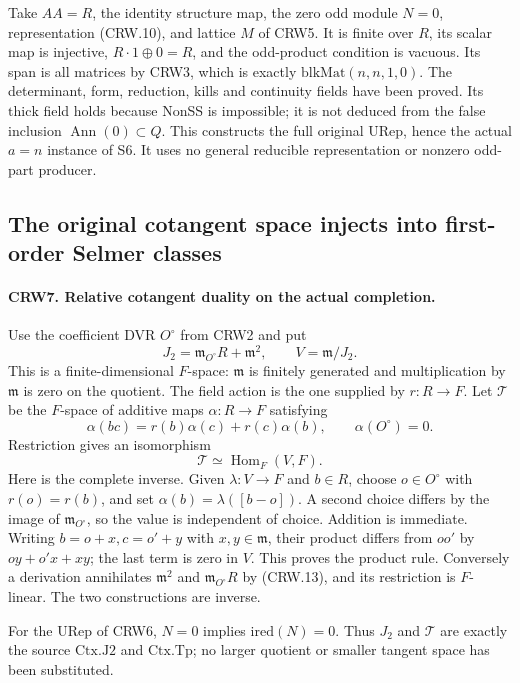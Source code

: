 Take $AA=R$, the identity structure map, the zero odd module
$N=0$, representation (CRW.10), and lattice $M$ of CRW5.
It is finite over $R$, its scalar map is injective,
$R\cdot1\oplus0=R$, and the odd-product condition is vacuous.
Its span is all matrices by CRW3, which is exactly
$\mathrm{blkMat}(n,n,1,0)$.
The determinant, form, reduction, kills and continuity fields
have been proved.  Its $\mathrm{thick}$ field holds because
NonSS is impossible; it is not deduced from the false
inclusion $\operatorname{Ann}(0)\subset Q$.
This constructs the full original $\mathrm{URep}$, hence the
actual $a=n$ instance of S6.  It uses no general reducible
representation or nonzero odd-part producer.

\subsection{The original cotangent space injects into first-order Selmer classes}

\paragraph{CRW7. Relative cotangent duality on the actual completion.}
\label{claim:CRW7}
Use the coefficient DVR $O^\circ$ from CRW2 and put
\[
 J_2=\mathfrak m_{O^\circ}R+\mathfrak m^2,
 \qquad V=\mathfrak m/J_2.
\]
This is a finite-dimensional $F$-space: $\mathfrak m$ is
finitely generated and multiplication by $\mathfrak m$ is zero
on the quotient.  The field action is the one supplied by
$r:R\to F$.  Let $\mathcal T$ be the $F$-space of additive
maps $\alpha:R\to F$ satisfying
\[
 \alpha(bc)=r(b)\alpha(c)+r(c)\alpha(b),
 \qquad \alpha(O^\circ)=0.                         \tag{CRW.13}
\]
Restriction gives an isomorphism
\[
 \mathcal T\simeq\operatorname{Hom}_F(V,F).          \tag{CRW.14}
\]
Here is the complete inverse.  Given $\lambda:V\to F$ and
$b\in R$, choose $o\in O^\circ$ with $r(o)=r(b)$, and set
$\alpha(b)=\lambda([b-o])$.
A second choice differs by the image of
$\mathfrak m_{O^\circ}$, so the value is independent of choice.
Addition is immediate.  Writing $b=o+x,c=o'+y$ with
$x,y\in\mathfrak m$, their product differs from $oo'$ by
$oy+o'x+xy$; the last term is zero in $V$.
This proves the product rule.  Conversely a derivation
annihilates $\mathfrak m^2$ and
$\mathfrak m_{O^\circ}R$ by (CRW.13), and its restriction is
$F$-linear.  The two constructions are inverse.

For the URep of CRW6, $N=0$ implies
$\mathrm{ired}(N)=0$.  Thus $J_2$ and $\mathcal T$ are
exactly the source $\mathrm{Ctx.J2}$ and $\mathrm{Ctx.Tp}$;
no larger quotient or smaller tangent space has been substituted.

